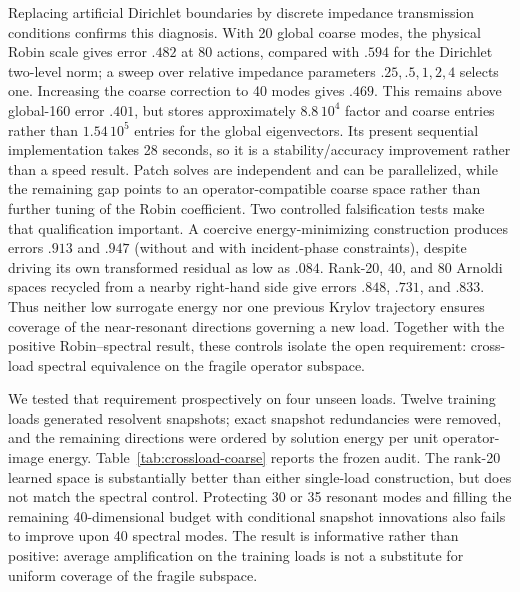 \documentclass[11pt]{article}
\numberwithin{algorithm}{section}
\theoremstyle{definition}\newtheorem{definition}[theorem]{Definition}
\theoremstyle{remark}\newtheorem{remark}[theorem]{Remark}
\begin{document}
Replacing artificial Dirichlet boundaries by discrete impedance transmission
conditions confirms this diagnosis. With 20 global coarse modes, the physical
Robin scale gives error $.482$ at 80 actions, compared with $.594$ for the
Dirichlet two-level norm; a sweep over relative impedance parameters
$.25,.5,1,2,4$ selects one. Increasing the coarse correction to 40 modes gives
$.469$. This remains above global-160 error $.401$, but stores approximately
$8.8\,10^4$ factor and coarse entries rather than $1.54\,10^5$ entries for the
global eigenvectors. Its present sequential implementation takes 28 seconds,
so it is a stability/accuracy improvement rather than a speed result. Patch
solves are independent and can be parallelized, while the remaining gap points
to an operator-compatible coarse space rather than further tuning of the Robin
coefficient. Two controlled falsification tests make that qualification
important. A coercive energy-minimizing construction produces errors $.913$
and $.947$ (without and with incident-phase constraints), despite driving its
own transformed residual as low as $.084$. Rank-20, 40, and 80 Arnoldi spaces
recycled from a nearby right-hand side give errors $.848$, $.731$, and $.833$.
Thus neither low surrogate energy nor one previous Krylov trajectory ensures
coverage of the near-resonant directions governing a new load. Together with
the positive Robin--spectral result, these controls isolate the open
requirement: cross-load spectral equivalence on the fragile operator subspace.

We tested that requirement prospectively on four unseen loads.  Twelve training
loads generated resolvent snapshots; exact snapshot redundancies were removed,
and the remaining directions were ordered by solution energy per unit
operator-image energy.  Table~\ref{tab:crossload-coarse} reports the frozen
audit.  The rank-20 learned space is substantially better than either
single-load construction, but does not match the spectral control.  Protecting
30 or 35 resonant modes and filling the remaining 40-dimensional budget with
conditional snapshot innovations also fails to improve upon 40 spectral modes.
The result is informative rather than positive: average amplification on the
training loads is not a substitute for uniform coverage of the fragile
subspace.
\end{document}
